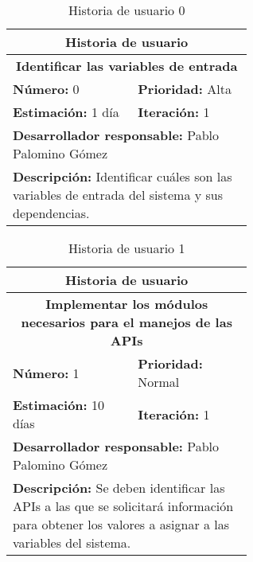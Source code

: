 \begin{table}[H]
        \centering
        \begin{tabular}{|p{0.3\linewidth}|p{0.3\linewidth}|}
          \hline
          \multicolumn{2}{|c|}{Historia de usuario}\\ \hline
          \multicolumn{2}{|c|}{\textbf{Identificar las variables de entrada}}\\ \hline
          \textbf{Número:} 0 & \textbf{Prioridad:} Alta\\ \hline
          \textbf{Estimación:} 1 día & \textbf{Iteración:} 1\\ \hline
          \multicolumn{2}{|l|}{\textbf{Desarrollador responsable:} Pablo Palomino Gómez}\\ \hline
          \multicolumn{2}{|p{0.6\linewidth}|}{\textbf{Descripción:} Identificar cuáles son las variables de entrada del sistema y sus dependencias.}\\ \hline
        \end{tabular}
        \caption{Historia de usuario 0}
        \label{tab:hist0}
\end{table}
\begin{table}[H]
        \centering
        \begin{tabular}{|p{0.3\linewidth}|p{0.3\linewidth}|}
          \hline
          \multicolumn{2}{|c|}{Historia de usuario}\\ \hline
          \multicolumn{2}{|c|}{\textbf{Implementar los módulos necesarios para el manejos de las APIs}}\\ \hline
          \textbf{Número:} 1 & \textbf{Prioridad:} Normal\\ \hline
          \textbf{Estimación:} 10 días & \textbf{Iteración:} 1\\ \hline
          \multicolumn{2}{|l|}{\textbf{Desarrollador responsable:} Pablo Palomino Gómez}\\ \hline
          \multicolumn{2}{|p{0.6\linewidth}|}{\textbf{Descripción:} Se deben identificar las APIs a las que se solicitará información para obtener los valores a asignar a las variables del sistema.}\\ \hline
        \end{tabular}
        \caption{Historia de usuario 1}
        \label{tab:hist1}
\end{table}
